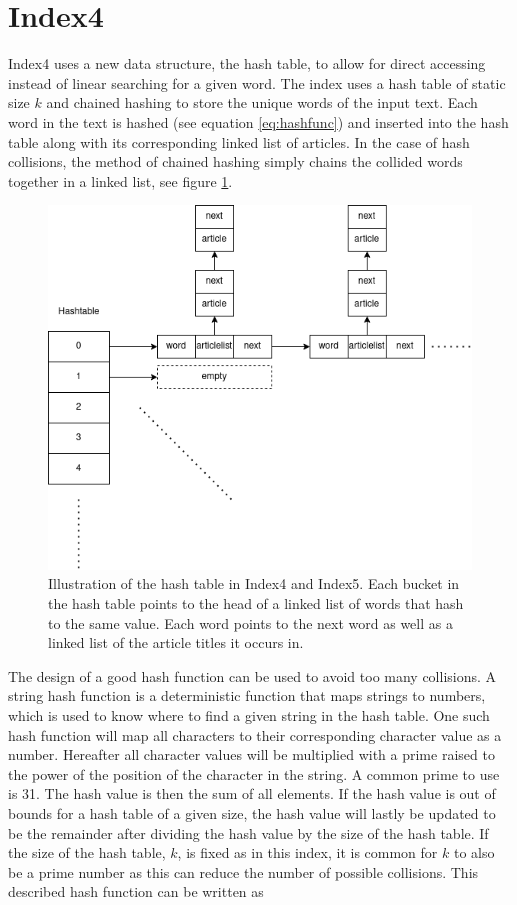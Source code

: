 \section{Index4}
\label{section:Index4}

Index4 uses a new data structure, the hash table, to allow for direct accessing instead of linear searching for a given word. The index uses a hash table of static size $k$ and chained hashing to store the unique words of the input text. Each word in the text is hashed (see equation \ref{eq:hashfunc}) and inserted into the hash table along with its corresponding linked list of articles. In the case of hash collisions, the method of chained hashing simply chains the collided words together in a linked list, see figure \ref{fig:index4hash table}. 

\begin{figure}[ht!]
    \centering
    \includegraphics[width=.7\textwidth]{LaTeX/Figures/BasicPart/index4hashtable.png}
    \caption{Illustration of the hash table in Index4 and Index5. Each bucket in the hash table points to the head of a linked list of words that hash to the same value. Each word points to the next word as well as a linked list of the article titles it occurs in.}
    \label{fig:index4hash table}
\end{figure}

The design of a good hash function can be used to avoid too many collisions. A string hash function is a deterministic function that maps strings to numbers, which is used to know where to find a given string in the hash table. One such hash function will map all characters to their corresponding character value as a number. Hereafter all character values will be multiplied with a prime raised to the power of the position of the character in the string. A common prime to use is 31. The hash value is then the sum of all elements. If the hash value is out of bounds for a hash table of a given size, the hash value will lastly be updated to be the remainder after dividing the hash value by the size of the hash table. If the size of the hash table, $k$, is fixed as in this index, it is common for $k$ to also be a prime number as this can reduce the number of possible collisions. This described hash function can be written as

